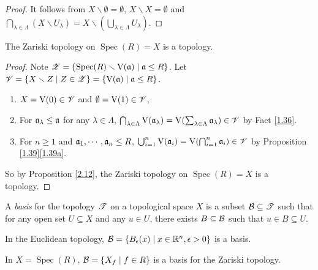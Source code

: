 \begin{proof}
    It follows from $X \smallsetminus \emptyset = \emptyset$, $X \smallsetminus X = \emptyset$ and $\bigcap_{\lambda \in \Lambda} (X \smallsetminus U_\lambda) = X \smallsetminus (\bigcup_{\lambda \in \Lambda} U_\lambda)$.
\end{proof}

\begin{theorem}\label{2.13}
    The Zariski topology on $\operatorname{Spec}(R) = X$ is a topology.
\end{theorem}

\begin{proof}
    Note $\mathscr{Z} = \{\operatorname{Spec}(R) \smallsetminus \operatorname{V}(\mathfrak{a}) \mid \mathfrak{a} \leq R\}$. Let $\mathscr{V} = \{X \smallsetminus Z \mid Z \in \mathscr{Z}\} = \{\operatorname{V}(\mathfrak{a}) \mid \mathfrak{a} \leq R\}$. 
    \begin{enumerate}
        \item $X = \operatorname{V}(0) \in \mathscr{V}$ and $\emptyset = \operatorname{V}(1) \in \mathscr{V}$,
        \item For $\mathfrak{a}_\lambda \leq \mathfrak{a}$ for any $\lambda \in \Lambda$, $\bigcap_{\lambda \in \Lambda} \operatorname{V}(\mathfrak{a}_\lambda) = \operatorname{V}(\sum_{\lambda \in \Lambda} \mathfrak{a}_\lambda) \in \mathscr{V}$ by Fact \ref{1.36}.
        \item For $n \geq 1$ and $\mathfrak{a}_1,\cdots,\mathfrak{a}_n \leq R$, $\bigcup_{i=1}^n \operatorname{V}(\mathfrak{a}_i) = \operatorname{V}(\bigcap_{i=1}^n \mathfrak{a}_i) \in \mathscr{V}$ by Proposition \ref{1.39}\ref{1.39a}. \qedhere
    \end{enumerate}
    So by Proposition \ref{2.12}, the Zariski topology on $\operatorname{Spec}(R) = X$ is a topology.
\end{proof}

\begin{definition}\label{2.14}
    A \emph{basis} for the topology $\mathscr{T}$ on a topological space $X$ is a subset $\mathcal{B} \subseteq \mathscr{T}$ such that for any open set $U \subseteq X$ and any $u \in U$, there exists $B \subseteq \mathcal{B}$ such that $u \in B \subseteq U$.
\end{definition}

\begin{example}\label{2.15}
    In the Euclidean topology, $\mathcal{B} = \{B_\epsilon(x) \mid x \in \mathbb{R}^n, \epsilon > 0\}$ is a basis.
\end{example}

\begin{theorem}\label{2.16}
    In $X = \operatorname{Spec}(R)$, $\mathcal{B} = \{X_f \mid f \in R\}$ is a basis for the Zariski topology.
\end{theorem}

